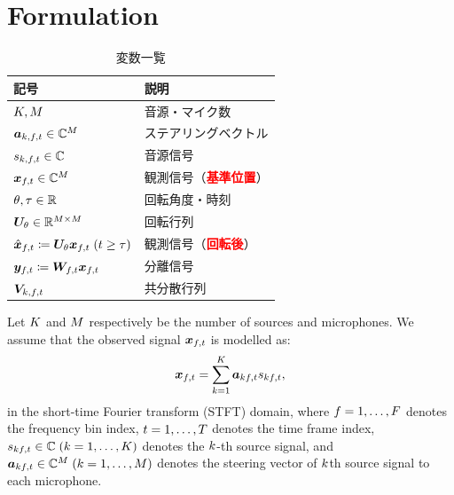 \documentclass[twocolumn,9pt,dvipdfmx]{article}
\begin{document}
\section{Formulation}
\begin{table}[t]
  \centering
  \caption{変数一覧}
  \begin{tabular}{ll}
    \toprule
      記号 & 説明 \\
    \midrule
      $K, M$                                                                        & 音源・マイク数 \\
      $\steer _{\src,\ft} \in \C ^{\Mic}$                                                 & ステアリングベクトル \\
      $\sig _{\src,\ft} \in \C$                                                           & 音源信号 \\
      $\Obs _{\ft} \in \C^{\Mic}$                                                         & 観測信号（\textcolor{red}{\textbf{基準位置}}） \\
      $\theta, \tau \in \mathbb{R}$                                                           & 回転角度・時刻 \\
      $\bm{U} _{\theta} \in \mathbb{R} ^{M \times M}$                                     & 回転行列 \\
      $\rotObs _{\ft} \coloneqq \rotMat _{\rotDeg} \Obs _{\ft} \; (\tframe \geq \rotFra)$ & 観測信号（\textcolor{red}{\textbf{回転後}}） \\
      $\Est _{\ft} \coloneqq \Demix _{\ft} \Obs _{\ft}$                                   & 分離信号 \\
      $\cov _{\src,\ft}$                                                                  & 共分散行列 \\
    \bottomrule
  \end{tabular}
\end{table}

Let $K$ and $M$ respectively be the number of sources and microphones.
We assume that the observed signal $\Obs _{\ft}$ is modelled as:
\begin{equation}
  \Obs _{\ft} = \sum _{\src=1} ^{\Src} \steer _{\src\ft} \sig _{\src\ft},
\end{equation}
in the short-time Fourier transform (STFT) domain,
where $f = 1, \dots, F$ denotes the frequency bin index,
$t = 1, \dots, T$ denotes the time frame index,
$\sig _{\src\ft} \in \C\; (\src = 1, \dots, \Src)$ denotes the $k$-th source signal, and
$\steer _{\src\ft} \in \C ^{\Mic}\; (\src = 1, \dots, \Mic)$ denotes the steering vector of $k$th source signal to each microphone.
\end{document}
